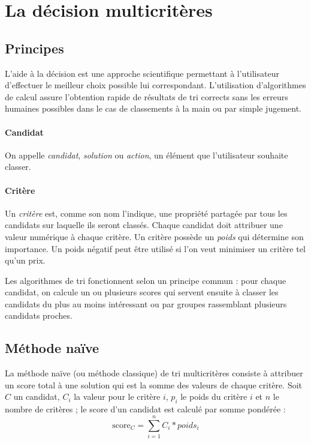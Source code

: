 \documentclass[a4paper]{article}
\begin{document}
\newpage
\tableofcontents

\newpage

\section{La décision multicritères}

\subsection{Principes}

L'aide à la décision est une approche scientifique permettant à l'utilisateur d'effectuer le meilleur choix possible lui correspondant. L'utilisation d'algorithmes de calcul assure l'obtention rapide de résultats de tri corrects sans les erreurs humaines possibles dans le cas de classements à la main ou par simple jugement.

\paragraph{Candidat} On appelle \textit{candidat}, \textit{solution} ou \textit{action}, un élément que l'utilisateur souhaite classer.

\paragraph{Critère} Un \textit{critère} est, comme son nom l'indique, une propriété partagée par tous les candidats sur laquelle ils seront classés. Chaque candidat doit attribuer une valeur numérique à chaque critère. Un critère possède un \textit{poids} qui détermine son importance. Un poids négatif peut être utilisé si l'on veut minimiser un critère tel qu'un prix.

\par
Les algorithmes de tri fonctionnent selon un principe commun : pour chaque candidat, on calcule un ou plusieurs scores qui servent ensuite à classer les candidats du plus au moins intéressant ou par groupes rassemblant plusieurs candidats proches.

\newpage

\subsection{Méthode naïve}

La méthode naïve (ou méthode classique) de tri multicritères consiste à attribuer un score total à une solution qui est la somme des valeurs de chaque critère. Soit \(C\) un candidat, \(C_i\) la valeur pour le critère \(i\), \(p_i\) le poids du critère \(i\) et \(n\) le nombre de critères ; le score d'un candidat est calculé par somme pondérée :
\[\mbox{score}_{C}=\sum_{i=1}^nC_i*poids_i\]
\end{document}
